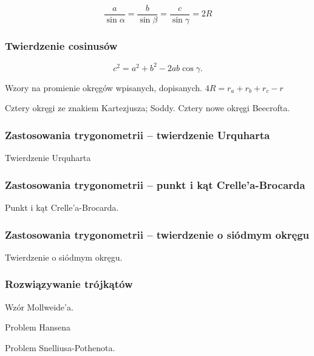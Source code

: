 $$\frac{a}{\sin \alpha} = \frac{b}{\sin \beta} = \frac{c}{\sin \gamma} = 2R$$

\subsubsection{Twierdzenie cosinusów}
\begin{proposition}
	\label{twierdzenie_cosinusow}%
	\begin{equation}
		c^2 = a^2 + b^2 - 2ab \cos \gamma.
	\end{equation}
\end{proposition}

%

Wzory na promienie okręgów wpisanych, dopisanych.
$4R = r_a + r_b + r_c - r$ %

Cztery okręgi ze znakiem Kartezjusza; Soddy.
Cztery nowe okręgi Beecrofta.


\subsubsection{Zastosowania trygonometrii -- twierdzenie Urquharta}
Twierdzenie Urquharta

\subsubsection{Zastosowania trygonometrii -- punkt i kąt Crelle'a-Brocarda}
Punkt i kąt Crelle'a-Brocarda.

\subsubsection{Zastosowania trygonometrii -- twierdzenie o siódmym okręgu}
Twierdzenie o siódmym okręgu.

\subsubsection{Rozwiązywanie trójkątów}
Wzór Mollweide'a.
%

Problem Hansena
%

Problem Snelliusa-Pothenota.
%

